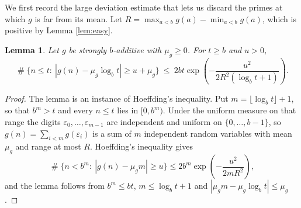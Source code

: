 \documentclass[11pt,reqno]{amsart}
\theoremstyle{plain}
\newtheorem{lemma}[theorem]{Lemma}
\theoremstyle{definition}
\DeclareMathOperator{\Card}{\#}
\begin{document}
We first record the large deviation estimate that lets us discard the primes at which $g$ is far from its mean. Let $R=\max_{a<b}g(a)-\min_{a<b}g(a)$, which is positive by Lemma \ref{lem:easy}.

\begin{lemma}\label{lem:hoeffding}
Let $g$ be strongly $b$-additive with $\mu_g\ge0$. For $t\ge b$ and $u>0$,
\[
\Card\{n\le t:\ |g(n)-\mu_g\log_bt|\ge u+\mu_g\}\ \le\ 2bt\exp\left(-\frac{u^{2}}{2R^{2}(\log_bt+1)}\right).
\]
\end{lemma}

\begin{proof}
The lemma is an instance of Hoeffding's inequality. Put $m=\lfloor\log_bt\rfloor+1$, so that $b^{m}>t$ and every $n\le t$ lies in $[0,b^m)$. Under the uniform measure on that range the digits $\varepsilon_0,\dots,\varepsilon_{m-1}$ are independent and uniform on $\{0,\dots,b-1\}$, so $g(n)=\sum_{i<m}g(\varepsilon_i)$ is a sum of $m$ independent random variables with mean $\mu_g$ and range at most $R$. Hoeffding's inequality \cite{hoeffding} gives
\[
\Card\{n<b^{m}:\ |g(n)-\mu_gm|\ge u\}\le 2b^{m}\exp\left(-\frac{u^{2}}{2mR^{2}}\right),
\]
and the lemma follows from $b^m\le bt$, $m\le\log_bt+1$ and $|\mu_gm-\mu_g\log_bt|\le\mu_g$.
\end{proof}
\end{document}
